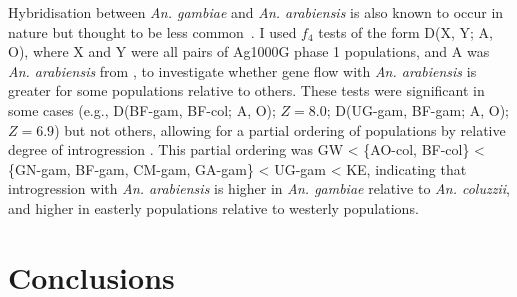 \begin{refsection}
Hybridisation between \textit{An. gambiae} and \textit{An. arabiensis} is also known to occur in nature but thought to be less common~\parencite{White1971,Coluzzi1979,dellaTorre1997}.
%
I used $f_4$ tests of the form D(X, Y; A, O), where X and Y were all pairs of Ag1000G phase 1 populations, and A was \textit{An. arabiensis} from \textcite{Neafsey2015}, to investigate whether gene flow with \textit{An. arabiensis} is greater for some populations relative to others.
%
These tests were significant in some cases (e.g., D(BF-gam, BF-col; A, O); $Z=8.0$; D(UG-gam, BF-gam; A, O); $Z=6.9$) but not others, allowing for a partial ordering of populations by relative degree of introgression .
%
This partial ordering was GW < \{AO-col, BF-col\} < \{GN-gam, BF-gam, CM-gam, GA-gam\} < UG-gam < KE, indicating that introgression with \textit{An. arabiensis} is higher in \textit{An. gambiae} relative to \textit{An. coluzzii}, and higher in easterly populations relative to westerly populations.


\section{Conclusions}\label{sec:ch4-conclusions}



\end{refsection}
